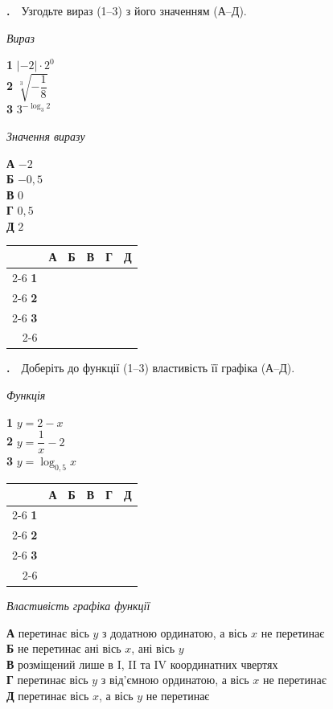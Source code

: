 \documentclass[12pt]{article}
\newcommand{\matchingGrid}{%
    \begingroup
    \renewcommand{\arraystretch}{1.15}
    \setlength{\tabcolsep}{4pt}
    \footnotesize
    \begin{tabular}{r|c|c|c|c|c|}
         \multicolumn{1}{c}{} & \multicolumn{1}{c}{\textbf{А}} & \multicolumn{1}{c}{\textbf{Б}} & \multicolumn{1}{c}{\textbf{В}} & \multicolumn{1}{c}{\textbf{Г}} & \multicolumn{1}{c}{\textbf{Д}} \\ \cline{2-6}
         \textbf{1} & \phantom{X} & \phantom{X} & \phantom{X} & \phantom{X} & \phantom{X} \\ \cline{2-6}
         \textbf{2} & & & & & \\ \cline{2-6}
         \textbf{3} & & & & & \\ \cline{2-6}
    \end{tabular}
    \endgroup
}
\newcounter{zad}
\newcommand{\zadtask}[1]{\stepcounter{zad}\par\vspace{0.3cm}\noindent\textbf{\thezad.}\ \ #1\par\vspace{0.2cm}}
\begin{document}
\zadtask{Узгодьте вираз (1--3) з його значенням (А--Д).\par
\vspace{0.3cm}
\noindent
\begin{minipage}[t]{0.42\textwidth}
\textit{Вираз}\par\vspace{0.15cm}
\textbf{1} \quad $|-2| \cdot 2^0$\\[0.35cm]
\textbf{2} \quad $\sqrt[3]{-\dfrac{1}{8}}$\\[0.35cm]
\textbf{3} \quad $3^{-\log_3 2}$
\end{minipage}%
\hfill
\begin{minipage}[t]{0.3\textwidth}
\textit{Значення виразу}\par\vspace{0.15cm}
\textbf{А} \quad $-2$\\[0.15cm]
\textbf{Б} \quad $-0{,}5$\\[0.15cm]
\textbf{В} \quad $0$\\[0.15cm]
\textbf{Г} \quad $0{,}5$\\[0.15cm]
\textbf{Д} \quad $2$
\end{minipage}%
\hfill
\begin{minipage}[t]{0.2\textwidth}
\vspace{0.4cm}
\begin{flushright}\matchingGrid\end{flushright}
\end{minipage}}

\zadtask{Доберіть до функції (1--3) властивість її графіка (А--Д).\par
\vspace{0.3cm}
\noindent
\begin{minipage}[t]{0.32\textwidth}
\textit{Функція}\par\vspace{0.2cm}
\textbf{1} \quad $y = 2 - x$\\[0.35cm]
\textbf{2} \quad $y = \dfrac{1}{x} - 2$\\[0.35cm]
\textbf{3} \quad $y = \log_{0{,}5} x$
\par\vspace{0.4cm}
\matchingGrid
\end{minipage}%
\hfill
\begin{minipage}[t]{0.64\textwidth}
\textit{Властивість графіка функції}\par\vspace{0.2cm}
\textbf{А} \quad перетинає вісь $y$ з додатною ординатою, а вісь $x$ не перетинає\\[0.15cm]
\textbf{Б} \quad не перетинає ані вісь $x$, ані вісь $y$\\[0.15cm]
\textbf{В} \quad розміщений лише в I, II та IV координатних чвертях\\[0.15cm]
\textbf{Г} \quad перетинає вісь $y$ з від'ємною ординатою, а вісь $x$ не перетинає\\[0.15cm]
\textbf{Д} \quad перетинає вісь $x$, а вісь $y$ не перетинає
\end{minipage}}
\end{document}
